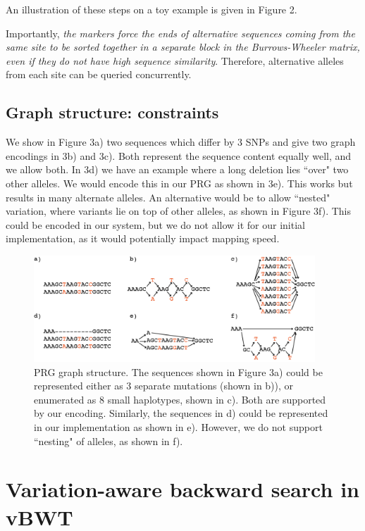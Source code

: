 \documentclass[runningheads,a4paper]{llncs}
\begin{document}
An illustration of these steps on a toy example is given in Figure 2. 

Importantly, \textit{the markers force the ends of alternative sequences coming from the same site to be sorted together in a separate block in the Burrows-Wheeler matrix, even if they do not have high sequence similarity}. Therefore, alternative alleles from each site can be queried concurrently.


\subsection{Graph structure: constraints}


We show in Figure 3a) two sequences which differ by 3 SNPs and give two graph encodings in 3b) and 3c). Both represent the sequence content equally well, and we allow both.
In 3d) we have an example where a long deletion lies ``over" two other alleles. We would encode this in our PRG as shown in 3e). This works but results in many alternate alleles. An alternative would be to allow ``nested" variation, where variants lie on top of other alleles, as shown in Figure 3f). This could be encoded in our system, but we do not allow it for our initial implementation, as it would potentially impact mapping speed. 

\begin{figure}
\centering
\includegraphics[height=4cm]{graph_construction.png}
\caption{PRG graph structure. The sequences shown in Figure 3a) could be represented either as 3 separate mutations (shown in b)), or enumerated as 8 small haplotypes, shown in c). Both are supported by our encoding. Similarly, the sequences in d) could be represented in our implementation as shown in e). However, we do not support ``nesting" of alleles, as shown in f).}
\label{lab2}
\end{figure}


\section{Variation-aware backward search in vBWT}
\end{document}

